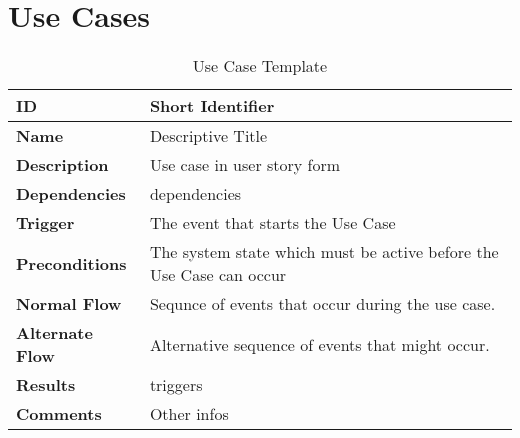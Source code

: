 \section{Use Cases}

\begin{table}[H]
    \begin{tabular}{ | >{\bfseries}l | p{9.5cm} |}
    \hline
    ID &  Short Identifier \\ \hline
    Name & Descriptive Title \\ \hline
    Description &  Use case in user story form\\ \hline
    Dependencies & dependencies \\ \hline
    Trigger & The event that starts the Use Case \\ \hline
    Preconditions & The system state which must be active before the Use Case can occur \\ \hline
    Normal Flow & Sequnce of events that occur during the use case. \\ \hline
    Alternate Flow & Alternative sequence of events that might occur. \\ \hline
    Results & triggers \\ \hline
    Comments & Other infos \\ \hline
    \end{tabular}

    \caption{Use Case Template}
    \label{fig:uc_template}
\end{table}

